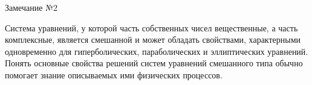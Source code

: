 \documentclass[10pt,xcolor=pst,aspectratio=169]{beamer}
\begin{document}
\begin{frame}{Замечание №2}

    \transdissolve[duration=0.1]
    \justifying
    \large

    Система уравнений, у которой часть собственных чисел вещественные, а часть комплексные, является смешанной и может обладать свойствами, характерными одновременно для гиперболических, параболических и эллиптических уравнений.\\

    Понять основные свойства решений систем уравнений смешанного типа обычно помогает знание описываемых ими физических процессов.

\end{frame}
\end{document}
